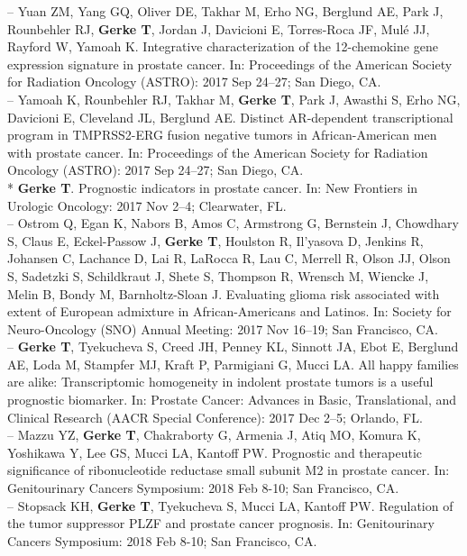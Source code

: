 \documentclass[11pt, a4paper]{article} %
\begin{document}
-- Yuan ZM, Yang GQ, Oliver DE, Takhar M, Erho NG, Berglund AE, Park J, Rounbehler RJ, {\bf Gerke T}, Jordan J, Davicioni E, Torres-Roca JF, Mul\'{e} JJ, Rayford W, Yamoah K. Integrative characterization of the 12-chemokine gene expression signature in prostate cancer. In: Proceedings of the American Society for Radiation Oncology (ASTRO): 2017 Sep 24--27; San Diego, CA.\\

-- Yamoah K, Rounbehler RJ, Takhar M, {\bf Gerke T}, Park J, Awasthi S, Erho NG, Davicioni E, Cleveland JL, Berglund AE. Distinct AR-dependent transcriptional program in TMPRSS2-ERG fusion negative tumors in African-American men with prostate cancer. In: Proceedings of the American Society for Radiation Oncology (ASTRO): 2017 Sep 24--27; San Diego, CA.\\

* {\bf Gerke T}. Prognostic indicators in prostate cancer. In: New Frontiers in Urologic Oncology: 2017 Nov 2--4; Clearwater, FL.\\

-- Ostrom Q, Egan K, Nabors B, Amos C, Armstrong G, Bernstein J, Chowdhary S, Claus E, Eckel-Passow J, {\bf Gerke T}, Houlston R, Il'yasova D, Jenkins R, Johansen C, Lachance D, Lai R, LaRocca R, Lau C, Merrell R, Olson JJ, Olson S, Sadetzki S, Schildkraut J, Shete S, Thompson R, Wrensch M, Wiencke J, Melin B, Bondy M, Barnholtz-Sloan J. Evaluating glioma risk associated with extent of European admixture in African-Americans and Latinos. In: Society for Neuro-Oncology (SNO) Annual Meeting: 2017 Nov 16--19; San Francisco, CA.\\

-- {\bf Gerke T}, Tyekucheva S, Creed JH, Penney KL, Sinnott JA, Ebot E, Berglund AE, Loda M, Stampfer MJ, Kraft P, Parmigiani G, Mucci LA. All happy families are alike: Transcriptomic homogeneity in indolent prostate tumors is a useful prognostic biomarker. In: Prostate Cancer: Advances in Basic, Translational, and Clinical Research (AACR Special Conference): 2017 Dec 2--5; Orlando, FL.\\

-- Mazzu YZ, {\bf Gerke T}, Chakraborty G, Armenia J, Atiq MO, Komura K, Yoshikawa Y, Lee GS, Mucci LA, Kantoff PW. Prognostic and therapeutic significance of ribonucleotide reductase small subunit M2 in prostate cancer. In: Genitourinary Cancers Symposium: 2018 Feb 8-10; San Francisco, CA.\\

-- Stopsack KH, {\bf Gerke T}, Tyekucheva S, Mucci LA, Kantoff PW. Regulation of the tumor suppressor PLZF and prostate cancer prognosis. In: Genitourinary Cancers Symposium: 2018 Feb 8-10; San Francisco, CA.\\
\end{document}
